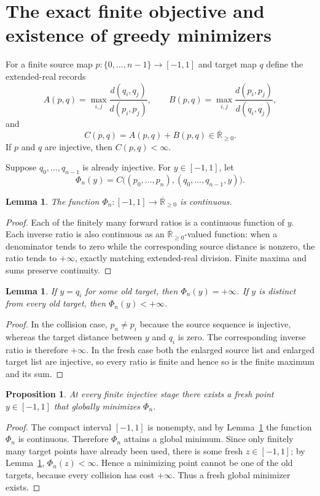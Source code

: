\documentclass[11pt]{amsart}
\newtheorem{lemma}[theorem]{Lemma}
\newtheorem{proposition}[theorem]{Proposition}
\theoremstyle{definition}
\theoremstyle{remark}
\newcommand{\eR}{\overline{\mathbb R}_{\ge 0}}
\begin{document}
\section{The exact finite objective and existence of greedy minimizers}

For a finite source map $p:\{0,\dots,n-1\}\to[-1,1]$ and target map $q$ define the extended-real records
\[
 A(p,q)=\max_{i,j}\frac{d(q_i,q_j)}{d(p_i,p_j)},\qquad
 B(p,q)=\max_{i,j}\frac{d(p_i,p_j)}{d(q_i,q_j)},
\]
and
\[
 C(p,q)=A(p,q)+B(p,q)\in\eR.
\]
If $p$ and $q$ are injective, then $C(p,q)<\infty$.

Suppose $q_0,\dots,q_{n-1}$ is already injective.  For $y\in[-1,1]$, let
\[
\Phi_n(y)=C\bigl((p_0,\dots,p_n),(q_0,\dots,q_{n-1},y)\bigr).
\]

\begin{lemma}\label{lem:continuity}
The function $\Phi_n:[-1,1]\to\eR$ is continuous.
\end{lemma}

\begin{proof}
Each of the finitely many forward ratios is a continuous function of $y$.  Each inverse ratio is also continuous as an $\eR$-valued function: when a denominator tends to zero while the corresponding source distance is nonzero, the ratio tends to $+\infty$, exactly matching extended-real division.  Finite maxima and sums preserve continuity.
\end{proof}

\begin{lemma}\label{lem:collision}
If $y=q_i$ for some old target, then $\Phi_n(y)=+\infty$.  If $y$ is distinct from every old target, then $\Phi_n(y)<+\infty$.
\end{lemma}

\begin{proof}
In the collision case, $p_n\ne p_i$ because the source sequence is injective, whereas the target distance between $y$ and $q_i$ is zero.  The corresponding inverse ratio is therefore $+\infty$.  In the fresh case both the enlarged source list and enlarged target list are injective, so every ratio is finite and hence so is the finite maximum and its sum.
\end{proof}

\begin{proposition}\label{prop:minimizer}
At every finite injective stage there exists a fresh point $y\in[-1,1]$ that globally minimizes $\Phi_n$.
\end{proposition}

\begin{proof}
The compact interval $[-1,1]$ is nonempty, and by Lemma~\ref{lem:continuity} the function $\Phi_n$ is continuous.  Therefore $\Phi_n$ attains a global minimum.  Since only finitely many target points have already been used, there is some fresh $z\in[-1,1]$; by Lemma~\ref{lem:collision}, $\Phi_n(z)<\infty$.  Hence a minimizing point cannot be one of the old targets, because every collision has cost $+\infty$.  Thus a fresh global minimizer exists.
\end{proof}
\end{document}
